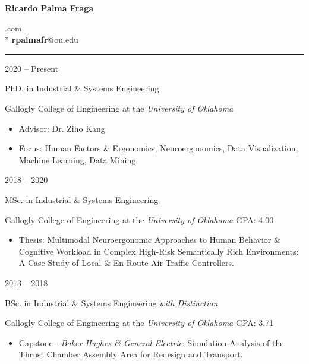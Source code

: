 \documentclass[a4paper,10pt]{article}
\newlength{\cvcolumngapwidth}
\newlength{\cvleftcolumnwidth}
\newlength{\cvrightcolumnwidth}
\newcommand{\cvsectionstyle}[1]{{\cvsectionfont\textcolor{cvsectioncolor}{#1}}}
\newcommand{\cvtitlestyle}[1]{{\large\cvtitlefont\textcolor{cvtitlecolor}{#1}}}
\newcommand{\cvdurationstyle}[1]{{\small\cvdurationfont\textcolor{cvdurationcolor}{#1}}}
\newlength{\cvafteritemskipamount}
\newlength{\cvaftersectionskipamount}
\newlength{\cvaftertitleskipamount}
\newlength{\cvparskip}
\newcommand{\cvpersonalinfo}[2]{
    \begin{minipage}[t]{\cvleftcolumnwidth}
        \vspace{0mm} %
        \raggedleft #1
    \end{minipage}%
    \hspace{\cvcolumngapwidth}%
    \begin{minipage}[t]{\cvrightcolumnwidth}
        \vspace{0mm} %
        #2
    \end{minipage}

    \vspace{\cvafteritemskipamount}
}
\newcommand{\cvsection}[1]{
    \begin{minipage}[t]{\cvleftcolumnwidth}
        \raggedleft\cvsectionstyle{#1}
    \end{minipage}%
    \hspace{\cvcolumngapwidth}%
    \begin{minipage}[t]{\cvrightcolumnwidth}
        \textcolor{cvrulecolor}{\rule{\cvrightcolumnwidth}{0.3mm}}
    \end{minipage}

    \vspace{\cvaftersectionskipamount}
}
\newcommand{\cvitem}[2]{
    \begin{minipage}[t]{\cvleftcolumnwidth}
        \raggedleft #1
    \end{minipage}%
    \hspace{\cvcolumngapwidth}%
    \begin{minipage}[t]{\cvrightcolumnwidth}
        \setlength{\parskip}{\cvparskip} #2
    \end{minipage}

    \vspace{\cvafteritemskipamount}
}
\newcommand{\cvtitle}[1]{
    \cvtitlestyle{#1}

    \vspace{\cvaftertitleskipamount}
    \vspace{-\cvparskip}
}
\begin{document}

\cvpersonalinfo{
    \textbf{\Large{Ricardo Palma Fraga}}
    
}{
        \vspace{-0.4cm}
        \hspace{121mm}.com
    \\* \null\hspace{96mm} \textbf{\large{rpalmafr}}\hspace{2mm}@ou.edu

}

\vspace{0.2cm}

\cvsection{EDUCATION}
\vspace{0.15cm}

\cvitem{
    \cvdurationstyle{2020 -- Present}
}{
    \cvtitle{PhD. in Industrial \& Systems Engineering}

    Gallogly College of Engineering at the \emph{University of Oklahoma}
    \vspace{0.15cm}
    
    \begin{itemize}[leftmargin=*]
        \item Advisor: Dr. Ziho Kang
        \item Focus: Human Factors \& Ergonomics, Neuroergonomics, Data Visualization, Machine Learning, Data Mining.

    \end{itemize}
}

\cvitem{
    \cvdurationstyle{2018 -- 2020}
}{
    \cvtitle{MSc. in Industrial \& Systems Engineering}

    Gallogly College of Engineering at the \emph{University of Oklahoma} \hfill{GPA: 4.00}
    \vspace{0.15cm}
    
    \begin{itemize}[leftmargin=*]
    
        \item Thesis: Multimodal Neuroergonomic Approaches to Human Behavior \& Cognitive Workload in Complex High-Risk Semantically Rich Environments: A Case Study of Local \& En-Route Air Traffic Controllers.

    \end{itemize}
}

\cvitem{
    \cvdurationstyle{2013 -- 2018}
}{
    \cvtitle{BSc. in Industrial \& Systems Engineering \emph{with Distinction}}

    Gallogly College of Engineering at the \emph{University of Oklahoma} \hfill{GPA: 3.71}
    \vspace{0.15cm}
    
    \begin{itemize}[leftmargin=*]
        \item Capstone - \emph{Baker Hughes \& General Electric}: Simulation Analysis of the Thrust Chamber Assembly Area for Redesign and Transport.
    \end{itemize}
}
\vspace{-0.15cm}
\end{document}
